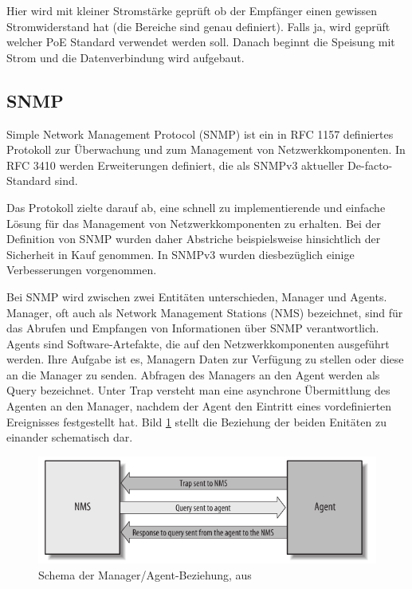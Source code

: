 Hier wird mit kleiner Stromstärke geprüft ob der Empfänger einen gewissen Stromwiderstand hat (die Bereiche sind genau definiert). Falls ja, wird geprüft welcher PoE Standard verwendet werden soll. Danach beginnt die Speisung mit Strom und die Datenverbindung wird aufgebaut.

\subsection{SNMP}
\label{sec:SNMP}
Simple Network Management Protocol (SNMP) ist ein in RFC 1157 definiertes Protokoll zur Überwachung und zum Management von Netzwerkkomponenten.\cite{rfc1157} In RFC 3410 werden Erweiterungen definiert, die als SNMPv3 aktueller De-facto-Standard sind.\cite{rfc3410}

Das Protokoll zielte darauf ab, eine schnell zu implementierende und einfache Lösung für das Management von Netzwerkkomponenten zu erhalten. Bei der Definition von SNMP wurden daher Abstriche beispielsweise hinsichtlich der Sicherheit in Kauf genommen. In SNMPv3 wurden diesbezüglich einige Verbesserungen vorgenommen.

Bei SNMP wird zwischen zwei Entitäten unterschieden, Manager und Agents. Manager, oft auch als Network Management Stations (NMS) bezeichnet, sind für das Abrufen und Empfangen von Informationen über SNMP verantwortlich.\cite{essential-SNMP} Agents sind Software-Artefakte, die auf den Netzwerkkomponenten ausgeführt werden. Ihre Aufgabe ist es, Managern Daten zur Verfügung zu stellen oder diese an die Manager zu senden. Abfragen des Managers an den Agent werden als Query bezeichnet. Unter Trap versteht man eine asynchrone Übermittlung des Agenten an den Manager, nachdem der Agent den Eintritt eines vordefinierten Ereignisses festgestellt hat. Bild \ref*{fig:snmp-schema} stellt die Beziehung der beiden Enitäten zu einander schematisch dar.

\begin{figure}[tbph]
\centering
\includegraphics[width=0.7\linewidth]{./figures/snmp-schema}
\caption{Schema der Manager/Agent-Beziehung, aus \cite{essential-SNMP}}
\label{fig:snmp-schema}
\end{figure}

